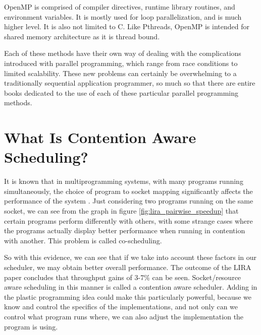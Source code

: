 OpenMP is comprised of compiler directives, runtime library routines, and environment variables. It is mostly used for loop parallelization, and is much higher level. It is also not limited to C. Like Pthreads, OpenMP is intended for shared memory architecture as it is thread bound.

Each of these methods have their own way of dealing with the complications introduced with parallel programming, which range from race conditions to limited scalability. These new problems can certainly be overwhelming to a traditionally sequential application programmer, so much so that there are entire books dedicated to the use of each of these particular parallel programming methods. 



\section{What Is Contention Aware Scheduling?}

It is known that in multiprogramming systems, with many programs running simultaneously, the choice of program to socket mapping significantly affects the performance of the system \cite{lira}. Just considering two programs running on the same socket, we can see from the graph in figure \ref{fig:lira_pairwise_speedup} that certain programs perform differently with others, with some strange cases where the programs actually display better performance when running in contention with another. This problem is called co-scheduling.

So with this evidence, we can see that if we take into account these factors in our scheduler, we may obtain better overall performance. The outcome of the LIRA paper concludes that throughput gains of 3-7\% can be seen. Socket/resource aware scheduling in this manner is called a contention aware scheduler. Adding in the plastic programming idea could make this particularly powerful, because we know and control the specifics of the implementations, and not only can we control what program runs where, we can also adjust the implementation the program is using.

